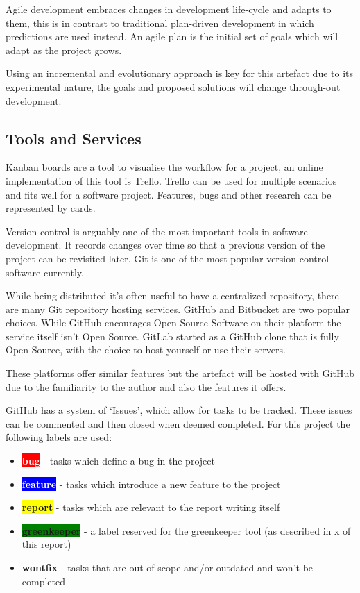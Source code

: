 Agile development embraces changes in development life-cycle and adapts to them, this is in contrast to traditional plan-driven development in which predictions are used instead. An agile plan is the initial set of goals which will adapt as the project grows. \cite{fowler_agile}

Using an incremental and evolutionary approach is key for this artefact due to its experimental nature, the goals and proposed solutions will change through-out development.

\subsection{Tools and Services} \label{a-d--methodology--tools}

Kanban boards are a tool to visualise the workflow for a project, an online implementation of this tool is Trello. Trello can be used for multiple scenarios and fits well for a software project. Features, bugs and other research can be represented by cards. \cite{trello} %

Version control is arguably one of the most important tools in software development. It records changes over time so that a previous version of the project can be revisited later. Git is one of the most popular version control software currently. \cite{git}

While being distributed it's often useful to have a centralized repository, there are many Git repository hosting services. GitHub and Bitbucket are two popular choices. While GitHub encourages Open Source Software on their platform the service itself isn't Open Source. \cite{github} GitLab started as a GitHub clone that is fully Open Source, with the choice to host yourself or use their servers. \cite{gitlab} \cite{bitbucket}

These platforms offer similar features but the artefact will be hosted with GitHub due to the familiarity to the author and also the features it offers.

GitHub has a system of `Issues', which allow for tasks to be tracked. These issues can be commented and then closed when deemed completed. For this project the following labels are used:

\begin{itemize}
  \item \textbf{\colorbox{red}{\textcolor{white}{bug}}} - tasks which define a bug in the project
  \item \textbf{\colorbox{blue}{\textcolor{white}{feature}}} -  tasks which introduce a new feature to the project
  \item \textbf{\colorbox{yellow}{report}} - tasks which are relevant to the report writing itself
  \item \textbf{\colorbox{green}{greenkeeper}} - a label reserved for the greenkeeper tool (as described in x of this report)
  \item \textbf{wontfix} - tasks that are out of scope and/or outdated and won't be completed
\end{itemize}

